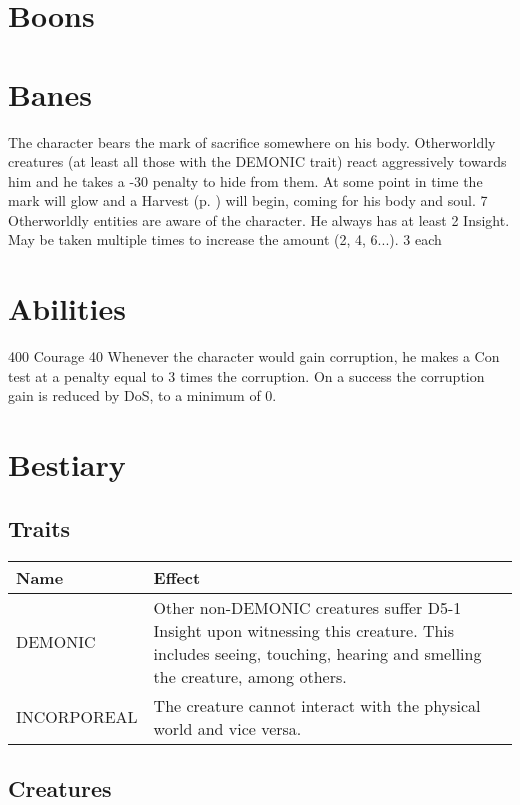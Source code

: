 \section{Boons}
\section{Banes}
	{The character bears the mark of sacrifice somewhere on his body.
		Otherworldly creatures (at least all those with the DEMONIC trait)
		react aggressively towards him
		and he takes a -30 penalty to hide from them.
		At some point in time the mark will glow and a Harvest (p. \pageref{anomaly:harvest}) will begin,
		coming for his body and soul.
	}
	{7}
	{}
	{Otherworldly entities are aware of the character.
		He always has at least 2 Insight.
		May be taken multiple times to increase the amount (2, 4, 6...).}
	{3}
	{each}
\section{Abilities}
	{400}
	{Courage 40}
	{Whenever the character would gain corruption,
		he makes a Con test at a penalty
		equal to 3 times the corruption.
		On a success the corruption gain is reduced by DoS, to a minimum of 0.}
\section{Bestiary}
\subsection{Traits}
\begin{tabularx}{\columnwidth}{l|X}
	Name & Effect \\ \hline
	DEMONIC & Other non-DEMONIC creatures suffer D5-1 Insight upon witnessing this creature. 
	This includes seeing, touching, hearing and smelling the creature, among others. \\
	\hline
	INCORPOREAL & The creature cannot interact with the physical world and vice versa.
\end{tabularx}

\subsection{Creatures}
